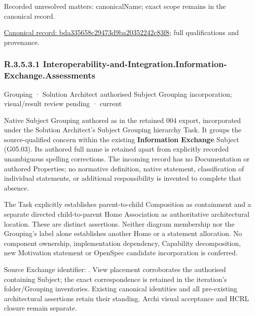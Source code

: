 {\small Recorded unresolved matters: canonicalName; exact scope remains in the canonical record.}\par
{\footnotesize \href{../../../../continuum/grouping/bda335658c29473d9ba20352242c83f8.md}{Canonical record: bda335658c29473d9ba20352242c83f8}; full qualifications and provenance.}\par
\subsubsection*{R.3.5.3.1 Interoperability-and-Integration.Information-Exchange.Assessments}
\label{navigation:R.3.5.3.1}

\label{element:0085c4fe23cf4b76829fae3369c9fbb1}
{\small Grouping · Solution Architect authorised Subject Grouping incorporation; visual/result review pending · current}\par

Native Subject Grouping authored as \texttt{} in the retained 004 export,
incorporated under the Solution Architect's Subject Grouping hierarchy Task.
It groups the source-qualified \texttt{} concern within
the existing \textbf{Information Exchange} Subject (G05.03). Its authored full name
is retained apart from explicitly recorded unambiguous spelling corrections.
The incoming record has no Documentation or authored Properties; no normative
definition, native statement, classification of individual statements, or
additional responsibility is invented to complete that absence.



The Task explicitly establishes parent-to-child Composition as containment and
a separate directed child-to-parent Home Association as authoritative architectural
location. These are distinct assertions. Neither diagram membership nor the
Grouping's label alone establishes another Home or a statement allocation.
No component ownership, implementation dependency, Capability decomposition,
new Motivation statement or OpenSpec candidate incorporation is conferred.



Source Exchange identifier: \texttt{}. View placement corroborates
the authorised containing Subject; the exact correspondence is retained in the
iteration's folder/Grouping inventories. Existing canonical identities and all
pre-existing architectural assertions retain their standing. Archi visual
acceptance and HCRL closure remain separate.


